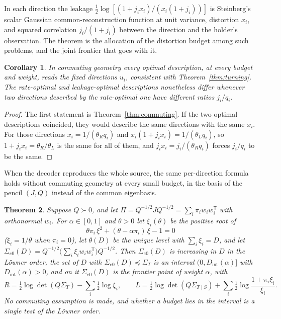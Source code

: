 \documentclass[11pt,onecolumn]{IEEEtran}
\newtheorem{theorem}{Theorem}
\newtheorem{corollary}[theorem]{Corollary}
\newcommand{\Sez}{\Sigma_{e0}}
\newcommand{\Kc}{\Sigma_{T\mid S}}
\begin{document}
In each direction the leakage
$\tfrac12\log[(1+j_ix_i)/(x_i(1+j_i))]$ is Steinberg's scalar Gaussian
common-reconstruction function \cite{steinberg2009} at unit variance,
distortion $x_i$, and squared correlation $j_i/(1+j_i)$ between the
direction and the holder's observation. The theorem is the allocation
of the distortion budget among such problems, and the joint frontier
that goes with it.

\begin{corollary}\label{cor:commmis}
In commuting geometry every optimal description, at every budget and
weight, reads the fixed directions $u_i$, consistent with
Theorem~\ref{thm:turning}. The rate-optimal and leakage-optimal
descriptions nonetheless differ whenever two directions described by the
rate-optimal one have different ratios $j_i/q_i$.
\end{corollary}

\begin{proof}
The first statement is Theorem~\ref{thm:commuting}. If the two optimal
descriptions coincided, they would describe the same directions with
the same $x_i$. For those directions $x_i=1/(\theta_Rq_i)$ and
$x_i(1+j_ix_i)=1/(\theta_Lq_i)$, so $1+j_ix_i=\theta_R/\theta_L$ is the same
for all of them, and $j_ix_i=j_i/(\theta_Rq_i)$ forces $j_i/q_i$ to be the
same.
\end{proof}

When the decoder reproduces the whole source, the same per-direction
formula holds without commuting geometry at every small budget, in the
basis of the pencil $(J,Q)$ instead of the common eigenbasis.

\begin{theorem}\label{thm:lowdist}
Suppose $Q\succ0$, and let
$\Pi=Q^{-1/2}JQ^{-1/2}=\sum_i\pi_iw_iw_i^{\mathsf T}$ with orthonormal
$w_i$. For $\alpha\in[0,1]$ and $\theta>0$ let $\xi_i(\theta)$ be the
positive root of
\begin{equation}
\theta\pi_i\,\xi^2+(\theta-\alpha\pi_i)\,\xi-1=0
\label{eq:lowroot}
\end{equation}
($\xi_i=1/\theta$ when $\pi_i=0$), let $\theta(D)$ be the unique level
with $\sum_i\xi_i=D$, and let
$\Sez(D)=Q^{-1/2}\bigl(\sum_i\xi_iw_iw_i^{\mathsf T}\bigr)Q^{-1/2}$. Then
$\Sez(D)$ is increasing in $D$ in the L\"owner order, the set of $D$ with
$\Sez(D)\preceq\Sigma_T$ is an interval $(0,D_{\mathrm{int}}(\alpha)]$
with $D_{\mathrm{int}}(\alpha)>0$, and on it $\Sez(D)$ is the frontier
point of weight $\alpha$, with
\[
R=\tfrac12\log\det(Q\Sigma_T)-\sum_i\tfrac12\log\xi_i,
\qquad
L=\tfrac12\log\det(Q\Kc)+\sum_i\tfrac12\log\frac{1+\pi_i\xi_i}{\xi_i} .
\]
No commuting assumption is made, and whether a budget lies in the
interval is a single test of the L\"owner order.
\end{theorem}
\end{document}
